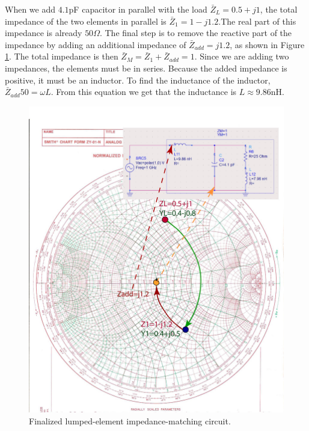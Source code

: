 \documentclass{ximera}
\begin{document}
When we add $4.1$pF capacitor in parallel with the load $\bar{Z}_L=0.5+j1$, the total impedance of the two elements in parallel is $\bar{Z}_1=1-j1.2$.The real part of this impedance is already $50\Omega$. The final step is to remove the reactive part of the impedance by adding an additional impedance of $\bar{Z}_{add}=j1.2$, as shown in Figure \ref{fig:LumpedImpM3}. The total impedance is then $\bar{Z}_M=\bar{Z}_1+\bar{Z}_{add}=1$. Since we are adding two impedances, the elements must be in series. Because the added impedance is positive, it must be an inductor. To find the inductance of the inductor, $\bar{Z}_{add} 50=\omega L$. From this equation we get that the inductance is $L \approx 9.86 $nH.



\begin{figure}[htbp]
\begin{center}
\includegraphics[scale=0.4]{../jpg/LumpedMatch3-01.jpg}
\end{center}
\caption{Finalized lumped-element impedance-matching circuit.}
\label{fig:LumpedImpM3}
\end{figure}
\end{document}
